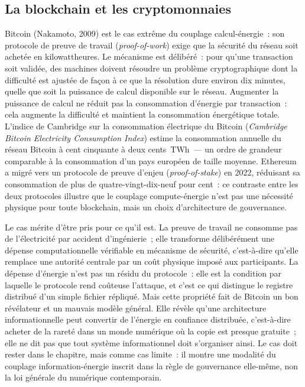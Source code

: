 \subsection{La blockchain et les cryptomonnaies}\label{subsec:blockchain}

%
Bitcoin (Nakamoto, 2009) est le cas extrême du couplage calcul-énergie~: son protocole de preuve de travail (\emph{proof-of-work}) exige que la sécurité du réseau soit achetée en kilowattheures. Le mécanisme est délibéré~: pour qu'une transaction soit validée, des machines doivent résoudre un problème cryptographique dont la difficulté est ajustée de façon à ce que la résolution dure environ dix minutes, quelle que soit la puissance de calcul disponible sur le réseau. Augmenter la puissance de calcul ne réduit pas la consommation d'énergie par transaction~: cela augmente la difficulté et maintient la consommation énergétique totale. L'indice de Cambridge sur la consommation électrique du Bitcoin (\emph{Cambridge Bitcoin Electricity Consumption Index}) estime la consommation annuelle du réseau Bitcoin à cent cinquante à deux cents~TWh~--- un ordre de grandeur comparable à la consommation d'un pays européen de taille moyenne. Ethereum a migré vers un protocole de preuve d'enjeu (\emph{proof-of-stake}) en 2022, réduisant sa consommation de plus de quatre-vingt-dix-neuf pour cent~: ce contraste entre les deux protocoles illustre que le couplage compute-énergie n'est pas une nécessité physique pour toute blockchain, mais un choix d'architecture de gouvernance.

%
Le cas mérite d'être pris pour ce qu'il est. La preuve de travail ne consomme pas de l'électricité par accident d'ingénierie~; elle transforme délibérément une dépense computationnelle vérifiable en mécanisme de sécurité, c'est-à-dire qu'elle remplace une autorité centrale par un coût physique imposé aux participants. La dépense d'énergie n'est pas un résidu du protocole~: elle est la condition par laquelle le protocole rend coûteuse l'attaque, et c'est ce qui distingue le registre distribué d'un simple fichier répliqué. Mais cette propriété fait de Bitcoin un bon révélateur et un mauvais modèle général. Elle révèle qu'une architecture informationnelle peut convertir de l'énergie en confiance distribuée, c'est-à-dire acheter de la rareté dans un monde numérique où la copie est presque gratuite~; elle ne dit pas que tout système informationnel doit s'organiser ainsi. Le cas doit rester dans le chapitre, mais comme cas limite~: il montre une modalité du couplage information-énergie inscrit dans la règle de gouvernance elle-même, non la loi générale du numérique contemporain.


